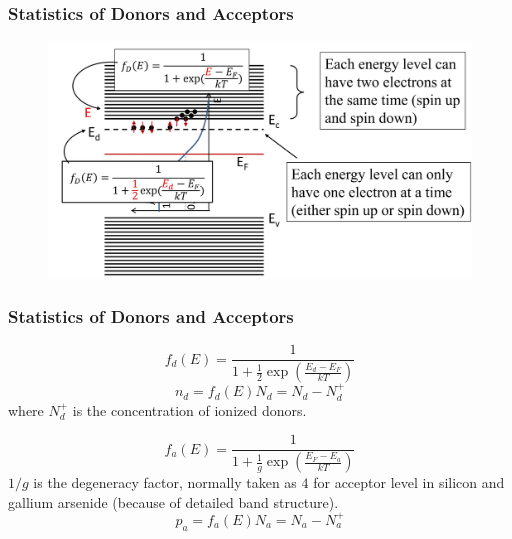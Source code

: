 \documentclass{beamer}
\begin{document}
    \begin{frame} \frametitle{Statistics of Donors and Acceptors}
        \begin{figure}[H]
            \centering
            \includegraphics[width=0.9\linewidth]{Probability-function-donors.jpg}
            \label{fig:Probability-function-donors.jpg}
        \end{figure}
    \end{frame}

    \begin{frame} \frametitle{Statistics of Donors and Acceptors}
        \begin{equation*}
            f_d(E) = \frac{1}{1 + \frac{1}{2} \exp \left( \frac{E_d - E_F}{kT}  \right)} 
        \end{equation*}
        \begin{equation*}
            n_d = f_d(E) N_d = N_d - N_d^+
        \end{equation*}
        where $N_d^+$ is the concentration of ionized donors.

        \begin{equation*}
            f_a(E) = \frac{1}{1 + \frac{1}{g} \exp\left( \frac{E_F - E_a}{kT}  \right)} 
        \end{equation*}
        $1/g$ is the degeneracy factor, normally taken as $4$ for acceptor level in silicon and gallium arsenide (because of detailed band structure). 
        \begin{equation*}
            p_a = f_a(E) N_a = N_a - N_a^+
        \end{equation*}
    \end{frame}
\end{document}
